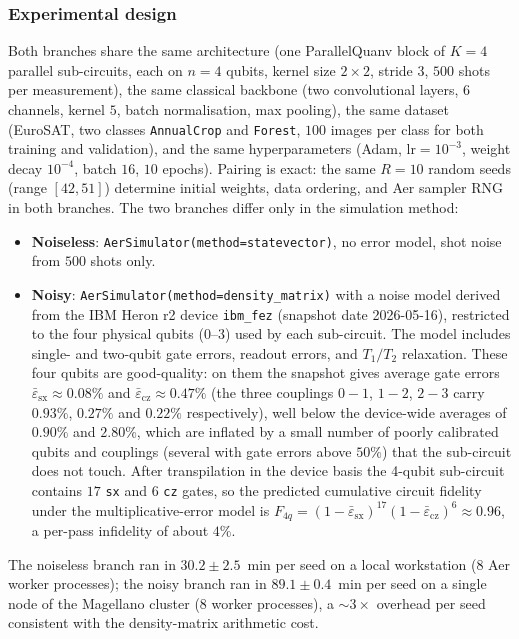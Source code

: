 \subsubsection{Experimental design}
\label{subsec:noise_design}

Both branches share the same architecture (one ParallelQuanv block of $K=4$ parallel sub-circuits, each on $n=4$ qubits, kernel size $2{\times}2$, stride $3$, $500$ shots per measurement), the same classical backbone (two convolutional layers, $6$ channels, kernel $5$, batch normalisation, max pooling), the same dataset (EuroSAT, two classes \texttt{AnnualCrop} and \texttt{Forest}, $100$ images per class for both training and validation), and the same hyperparameters (Adam, $\mathrm{lr}=10^{-3}$, weight decay $10^{-4}$, batch $16$, $10$ epochs). Pairing is exact: the same $R=10$ random seeds (range $[42,51]$) determine initial weights, data ordering, and Aer sampler RNG in both branches. The two branches differ only in the simulation method:
\begin{itemize}
  \item \textbf{Noiseless}: \texttt{AerSimulator(method=statevector)}, no error model, shot noise from $500$ shots only.
  \item \textbf{Noisy}: \texttt{AerSimulator(method=density\_matrix)} with a noise model derived from the IBM Heron r2 device \texttt{ibm\_fez} (snapshot date 2026-05-16), restricted to the four physical qubits ($0$--$3$) used by each sub-circuit. The model includes single- and two-qubit gate errors, readout errors, and $T_1/T_2$ relaxation. These four qubits are good-quality: on them the snapshot gives average gate errors $\bar{\varepsilon}_{\mathrm{sx}}\approx 0.08\%$ and $\bar{\varepsilon}_{\mathrm{cz}}\approx 0.47\%$ (the three couplings $0\!-\!1$, $1\!-\!2$, $2\!-\!3$ carry $0.93\%$, $0.27\%$ and $0.22\%$ respectively), well below the device-wide averages of $0.90\%$ and $2.80\%$, which are inflated by a small number of poorly calibrated qubits and couplings (several with gate errors above $50\%$) that the sub-circuit does not touch. After transpilation in the device basis the 4-qubit sub-circuit contains $17$ \texttt{sx} and $6$ \texttt{cz} gates, so the predicted cumulative circuit fidelity under the multiplicative-error model is $F_{4q}=(1-\bar{\varepsilon}_{\mathrm{sx}})^{17}(1-\bar{\varepsilon}_{\mathrm{cz}})^{6}\approx 0.96$, a per-pass infidelity of about $4\%$.
\end{itemize}
The noiseless branch ran in $30.2 \pm 2.5$~min per seed on a local workstation ($8$ Aer worker processes); the noisy branch ran in $89.1 \pm 0.4$~min per seed on a single node of the Magellano cluster ($8$ worker processes), a $\sim 3{\times}$ overhead per seed consistent with the density-matrix arithmetic cost.

